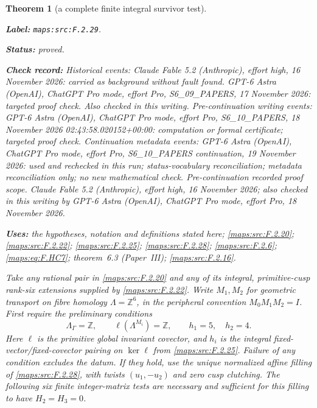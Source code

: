 \documentclass[11pt,a4paper]{article}
\newtheorem{theorem}{Theorem}[section]
\theoremstyle{definition}
\newcommand{\StatementRecord}[4]{\par\smallskip\begingroup\upshape\raggedright\noindent\textbf{Label:} \nolinkurl{#1}.\par\noindent\textbf{Status:} #2.\par\noindent\textbf{Check record:} #3.\par\noindent\textbf{Uses:} #4.\par\endgroup\smallskip}
\newcommand{\ExternalPaperRef}[3]{\ifmmode\text{\upshape #1#2 (Paper~#3)}\else #1#2 (Paper~#3)\fi}
\begin{document}
\begin{theorem}[a complete finite integral survivor test]\label{maps:src:F.2.29}
\StatementRecord{maps:src:F.2.29}{proved}{Historical events: Claude Fable 5.2 (Anthropic), effort high, 16 November 2026: carried as background without fault found. GPT-6 Astra (OpenAI), ChatGPT Pro mode, effort Pro, S6\_09\_PAPERS, 17 November 2026: targeted proof check. Also checked in this writing. Pre-continuation writing events: GPT-6 Astra (OpenAI), ChatGPT Pro mode, effort Pro, S6\_10\_PAPERS, 18 November 2026 02:43:58.020152+00:00: computation or formal certificate; targeted proof check. Continuation metadata events: GPT-6 Astra (OpenAI), ChatGPT Pro mode, effort Pro, S6\_10\_PAPERS continuation, 19 November 2026: used and rechecked in this run; status-vocabulary reconciliation; metadata reconciliation only; no new mathematical check. \emph{Pre-continuation recorded proof scope.} Claude Fable 5.2 (Anthropic), effort high, 16 November 2026; also checked in this writing by GPT-6 Astra (OpenAI), ChatGPT Pro mode, effort Pro, 18 November 2026}{the hypotheses, notation and definitions stated here; \cref{maps:src:F.2.20}; \cref{maps:src:F.2.22}; \cref{maps:src:F.2.25}; \cref{maps:src:F.2.28}; \cref{maps:src:F.2.6}; \cref{maps:eq:F.HC7}; \ExternalPaperRef{theorem~}{6.3}{III}; \cref{maps:src:F.2.16}}


Take any rational pair in \ref{maps:src:F.2.20} and any of its integral,
primitive-cusp rank-six extensions supplied by \ref{maps:src:F.2.22}.
Write $M_1,M_2$ for geometric transport on fibre homology
$\Lambda=\mathbb Z^6$, in the peripheral convention
$M_0M_1M_2=I$.
First require the preliminary conditions
\[
 \Lambda_\Gamma=\mathbb Z,\qquad
 \ell(\Lambda^{M_i})=\mathbb Z,\qquad h_1=5,\quad h_2=4 .
 \tag{F.HC1}\label{maps:eq:F.HC1}
\]
Here $\ell$ is the primitive global invariant covector, and
$h_i$ is the integral fixed-vector/fixed-covector pairing
on $\ker\ell$ from \ref{maps:src:F.2.25}.
Failure of any condition excludes the datum.
If they hold, use the unique normalized affine filling of
\ref{maps:src:F.2.28}, with twists $(u_1,-u_2)$ and zero cusp clutching.
The following six finite integer-matrix tests are necessary
and sufficient for this filling to have $H_2=H_3=0$.


\end{theorem}
\end{document}
